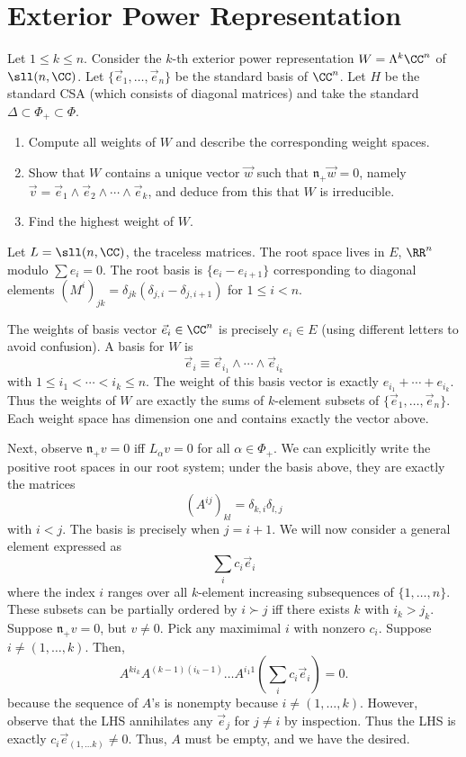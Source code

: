\documentclass[11pt, headheight=30pt]{scrartcl}
\begin{document}
\section{Exterior Power Representation}
\begin{prob*}
Let $1 \leq k \leq n$. Consider the $k$-th exterior power representation $W = \Lambda^k \CC^n$ of $\sll(n, \CC)$. Let $\{\vec{e}_1, \dots, \vec{e}_n\}$ be the standard basis of $\CC^n$. Let $H$ be the standard CSA (which consists of diagonal matrices) and take the standard $\Delta \subset \Phi_+ \subset \Phi$.
\begin{enumerate}
    \item Compute all weights of $W$ and describe the corresponding weight spaces.
    \item Show that $W$ contains a unique vector $\vec{w}$ such that $\mathfrak{n}_+ \vec{w} = 0$, namely $\vec{v} = \vec{e}_1 \wedge \vec{e}_2 \wedge \cdots \wedge \vec{e}_k$, and deduce from this that $W$ is irreducible.
    \item Find the highest weight of $W$.
\end{enumerate}
\end{prob*}

Let $L = \sll(n, \CC)$, the traceless matrices. The root space lives in $E$, $\RR^n$ modulo $\sum e_i = 0$. The root basis is $\{e_i - e_{i+1}\}$ corresponding to diagonal elements $(M^i)_{jk} = \delta_{jk}\left(\delta_{j,i} - \delta_{j,i+1}\right)$ for $1 \leq i < n$.

The weights of basis vector $\vec{e}_i\in \CC^n$ is precisely $e_i\in E$ (using different letters to avoid confusion). A basis for $W$ is
\[
    \vec{e}_i \equiv \vec{e}_{i_1} \wedge \cdots \wedge \vec{e}_{i_k}    
\]
with $1 \leq i_1 < \cdots < i_k \leq n$. The weight of this basis vector is exactly $e_{i_1} + \cdots + e_{i_k}$. Thus the weights of $W$ are exactly the sums of $k$-element subsets of $\{\vec{e}_1, \dots, \vec{e}_n\}$. Each weight space has dimension one and contains exactly the vector above.


Next, observe $\mathfrak{n}_+ v = 0$ iff $L_\alpha v = 0$ for all $\alpha \in \Phi_+$. We can explicitly write the positive root spaces in our root system; under the basis above, they are exactly the matrices
\[
    (A^{ij})_{kl} = \delta_{k,i}\delta_{l,j}
\]
with $i < j$. The basis is precisely when $j = i + 1$. We will now consider a general element expressed as
\[
    \sum_{i} c_i \vec{e}_{i}  
\]
where the index $i$ ranges over all $k$-element increasing subsequences of $\{1, \dots, n\}$. These subsets can be partially ordered by $i \succ j$ iff there exists $k$ with $i_k > j_k$. Suppose $\mathfrak{n}_+ v = 0$, but $v\neq 0$. Pick any maximimal $i$ with nonzero $c_i$. Suppose $i\neq (1, \dots, k)$.
Then,
\[
    A^{ki_k} A^{(k-1)(i_k - 1)}\dots A^{i_1 1}\left(\sum_{i} c_i \vec{e}_i\right) = 0.
\]
because the sequence of $A$'s is nonempty because $i\neq (1,\dots, k)$.
However, observe that the LHS annihilates any $\vec{e}_j$ for $j\neq i$ by inspection. Thus the LHS is exactly $c_i \vec{e}_{(1,\dots k)}\neq 0$. Thus, $A$ must be empty, and we have the desired.
\end{document}
